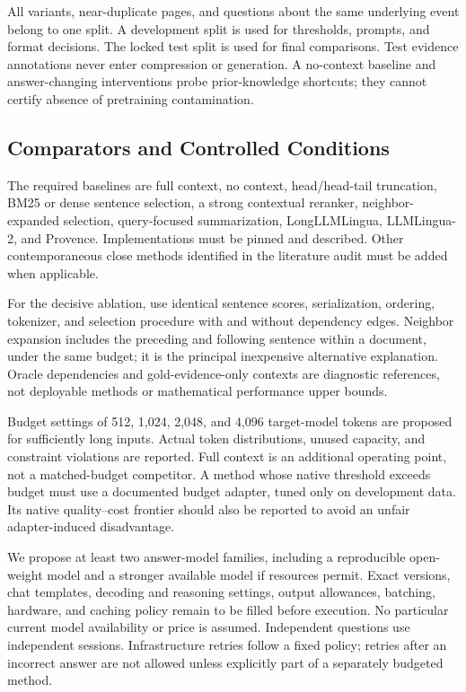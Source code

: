\documentclass[10pt,twocolumn]{article}
\begin{document}
All variants, near-duplicate pages, and questions about the same underlying event belong to one split. A development split is used for thresholds, prompts, and format decisions. The locked test split is used for final comparisons. Test evidence annotations never enter compression or generation. A no-context baseline and answer-changing interventions probe prior-knowledge shortcuts; they cannot certify absence of pretraining contamination.

\subsection{Comparators and Controlled Conditions}
The required baselines are full context, no context, head/head-tail truncation, BM25 or dense sentence selection, a strong contextual reranker, neighbor-expanded selection, query-focused summarization, LongLLMLingua, LLMLingua-2, and Provence. Implementations must be pinned and described. Other contemporaneous close methods identified in the literature audit must be added when applicable.

For the decisive ablation, use identical sentence scores, serialization, ordering, tokenizer, and selection procedure with and without dependency edges. Neighbor expansion includes the preceding and following sentence within a document, under the same budget; it is the principal inexpensive alternative explanation. Oracle dependencies and gold-evidence-only contexts are diagnostic references, not deployable methods or mathematical performance upper bounds.

Budget settings of 512, 1,024, 2,048, and 4,096 target-model tokens are proposed for sufficiently long inputs. Actual token distributions, unused capacity, and constraint violations are reported. Full context is an additional operating point, not a matched-budget competitor. A method whose native threshold exceeds budget must use a documented budget adapter, tuned only on development data. Its native quality--cost frontier should also be reported to avoid an unfair adapter-induced disadvantage.

We propose at least two answer-model families, including a reproducible open-weight model and a stronger available model if resources permit. Exact versions, chat templates, decoding and reasoning settings, output allowances, batching, hardware, and caching policy remain to be filled before execution. No particular current model availability or price is assumed. Independent questions use independent sessions. Infrastructure retries follow a fixed policy; retries after an incorrect answer are not allowed unless explicitly part of a separately budgeted method.
\end{document}
